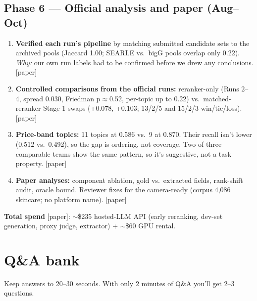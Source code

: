 \documentclass[11pt]{article}
\newcommand{\inpaper}{\textcolor{accent}{\small[paper]}}
\begin{document}
\subsection*{Phase 6 --- Official analysis and paper (Aug--Oct)}
\begin{enumerate}[resume,leftmargin=*]
  \item \textbf{Verified each run's pipeline} by matching submitted candidate sets to the
        archived pools (Jaccard 1.00; SEARLE vs.\ bigG pools overlap only 0.22). \emph{Why:}
        our own run labels had to be confirmed before we drew any conclusions. \inpaper
  \item \textbf{Controlled comparisons from the official runs:} reranker-only (Runs 2--4,
        spread 0.030, Friedman p$\approx$0.52, per-topic up to 0.22) vs.\ matched-reranker
        Stage-1 swaps (+0.078, +0.103; 13/2/5 and 15/2/3 win/tie/loss). \inpaper
  \item \textbf{Price-band topics:} 11 topics at 0.586 vs.\ 9 at 0.870. Their recall
        isn't lower (0.512 vs.\ 0.492), so the gap is ordering, not coverage. Two of three
        comparable teams show the same pattern, so it's suggestive, not a task property.
        \inpaper
  \item \textbf{Paper analyses:} component ablation, gold vs.\ extracted fields, rank-shift
        audit, oracle bound. Reviewer fixes for the camera-ready (corpus 4,086 skincare; no
        platform name). \inpaper
\end{enumerate}

\textbf{Total spend} \inpaper: $\sim$\$235 hosted-LLM API (early reranking, dev-set
generation, proxy judge, extractor) + $\sim$\$60 GPU rental.

\section{Q\&A bank}
Keep answers to 20--30 seconds. With only 2 minutes of Q\&A you'll get 2--3 questions.
\end{document}
